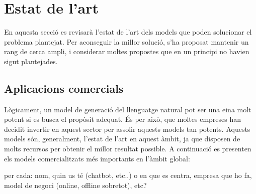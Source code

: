 \section{Estat de l'art}
En aquesta secció es revisarà l'estat de l'art dels models que poden solucionar el problema plantejat. Per aconseguir la millor solució, s'ha proposat mantenir un rang de cerca ampli, i considerar moltes propostes que en un principi no havien sigut plantejades.
\subsection{Aplicacions comercials}
Lògicament, un model de generació del llenguatge natural pot ser una eina molt potent si es busca el propòsit adequat. És per això, que moltes empreses han decidit invertir en aquest sector per assolir aquests models tan potents. Aquests models són, generalment, l'estat de l'art en aquest àmbit, ja que disposen de molts recursos per obtenir el millor resultat possible. A continuació es presenten els models comercialitzats més importants en l'àmbit global:

per cada: nom, quin us té (chatbot, etc..) o en que es centra, empresa que ho fa, model de negoci (online, offline sobretot), etc?

